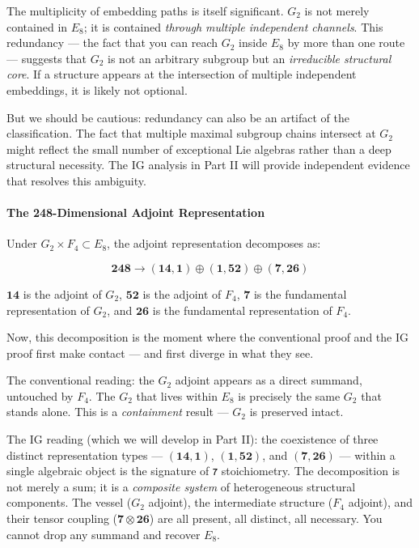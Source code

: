 \documentclass[12pt,a4paper]{article}
\begin{document}
The multiplicity of embedding paths is itself significant. $G_2$ is not merely contained in $E_8$; it is contained \emph{through multiple independent channels}. This redundancy --- the fact that you can reach $G_2$ inside $E_8$ by more than one route --- suggests that $G_2$ is not an arbitrary subgroup but an \emph{irreducible structural core}. If a structure appears at the intersection of multiple independent embeddings, it is likely not optional.

But we should be cautious: redundancy can also be an artifact of the classification. The fact that multiple maximal subgroup chains intersect at $G_2$ might reflect the small number of exceptional Lie algebras rather than a deep structural necessity. The IG analysis in Part II will provide independent evidence that resolves this ambiguity.

\paragraph{The 248-Dimensional Adjoint Representation}

Under $G_2 \times F_4 \subset E_8$, the adjoint representation decomposes as:

\[\mathbf{248} \to (\mathbf{14}, \mathbf{1}) \oplus (\mathbf{1}, \mathbf{52}) \oplus (\mathbf{7}, \mathbf{26})\]

$\mathbf{14}$ is the adjoint of $G_2$, $\mathbf{52}$ is the adjoint of $F_4$, $\mathbf{7}$ is the fundamental representation of $G_2$, and $\mathbf{26}$ is the fundamental representation of $F_4$.

Now, this decomposition is the moment where the conventional proof and the IG proof first make contact --- and first diverge in what they see.

The conventional reading: the $G_2$ adjoint appears as a direct summand, untouched by $F_4$. The $G_2$ that lives within $E_8$ is precisely the same $G_2$ that stands alone. This is a \emph{containment} result --- $G_2$ is preserved intact.

The IG reading (which we will develop in Part II): the coexistence of three distinct representation types --- $(\mathbf{14}, \mathbf{1})$, $(\mathbf{1}, \mathbf{52})$, and $(\mathbf{7}, \mathbf{26})$ --- within a single algebraic object is the signature of $𐑳$ stoichiometry. The decomposition is not merely a sum; it is a \emph{composite system} of heterogeneous structural components. The vessel ($G_2$ adjoint), the intermediate structure ($F_4$ adjoint), and their tensor coupling ($\mathbf{7} \otimes \mathbf{26}$) are all present, all distinct, all necessary. You cannot drop any summand and recover $E_8$.
\end{document}
